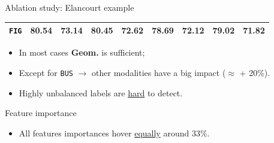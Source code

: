 \documentclass[10pt, export]{beamer}
\begin{document}
\begin{frame}{Ablation study: Elancourt example}
\begin{table}
\begin{center}
\begin{tabular}{|x{.5cm} | x{.8cm} x{.8cm} | x{.9cm} x{.9cm} | x{.8cm} x{.8cm} | x{.8cm} x{.8cm}|}
                        \hline
                        \texttt{FIG} & \textbf{80.54} & 73.14 & 80.45 & \textbf{72.62} & 78.69 & 72.12 & 79.02 & 71.82 \\
                        \hline
                    \end{tabular}
                \end{center}
            \end{table}
            \begin{itemize}[label=$\blacktriangleright$, font=\color{IGNGreen}]
                \item<2-> \footnotesize In most cases \textbf{Geom.} is sufficient;
                \item<3-> \footnotesize Except for \texttt{BUS} $\rightarrow$ other modalities have a big impact ($\approx$ + 20\%).
                \item<4-> \footnotesize Highly unbalanced labels are \underline{hard} to detect.
            \end{itemize}
        \end{frame}
        \begin{frame}{Feature importance}
            \begin{figure}
                
            \end{figure}
            \begin{itemize}[label=$\blacktriangleright$, font=\color{IGNGreen}]
                \item<2-> \footnotesize All features importances hover \underline{equally} around 33\%.
            \end{itemize}
        \end{frame}
\end{document}
